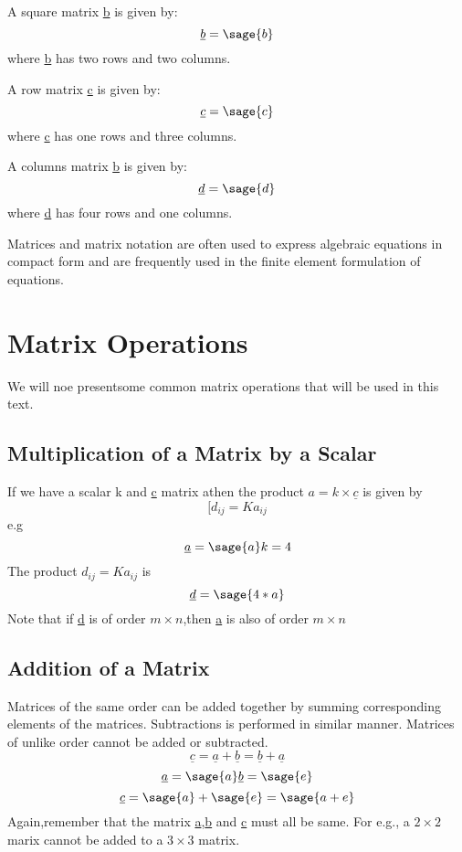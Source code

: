 \documentclass[12pt]{report}
\begin{document}
A square matrix \underline{b} is given by:
\begin{equation}
\underline{b}=\sage{b}
\label{eq:square}
\end{equation}
where \underline{b} has two rows and two columns.

A row matrix \underline{c} is given by:
\begin{equation}
\underline{c}=\sage{c}
\label{eq:row}
\end{equation}
where \underline{c} has one rows and three columns.

A columns matrix \underline{b} is given by:
\begin{equation}\underline{d}=\sage{d}
\label{eq:col}
\end{equation}
where \underline{d} has four rows and one columns.

Matrices and matrix notation are often used to express algebraic equations in compact form and are frequently used in the finite element formulation of equations.
\section{Matrix Operations}
We will noe presentsome common matrix operations that will be used in this text.
\subsection{Multiplication of a Matrix by a Scalar}
If we have a scalar k and \underline{c} matrix athen the product $a = k \times \underline{c} $ is given by
\begin{equation}[d_{{ij}} = Ka_{{ij}} \label{eq:element}
\end{equation}
e.g
$$\underline{a}=\sage{a}
k= 4 $$
The product $d_{{ij}} = Ka_{{ij}}$ is 
$$\underline{d} = \sage{4*a}$$
Note that if \underline{d} is of order $ m \times n $,then \underline{a} is also of order $ m \times n $
\subsection{Addition of a Matrix}
Matrices of the same order can be added together by summing corresponding elements of the matrices. Subtractions is performed in similar manner. Matrices of unlike order cannot be added or subtracted.
\begin{equation}\underline{c}=\underline{a}+\underline{b}= \underline{b}+\underline{a} \end{equation}
$$\underline{a}=\sage{a}
\underline{b}=\sage{e}$$
$$\underline{c}=\sage{a} + \sage{e}=\sage{a+e}$$
Again,remember that the matrix \underline{a},\underline{b} and \underline{c} must all be same. For e.g., a $ 2 \times 2 $ marix cannot be added to a $ 3 \times 3 $ matrix.
\end{document}
